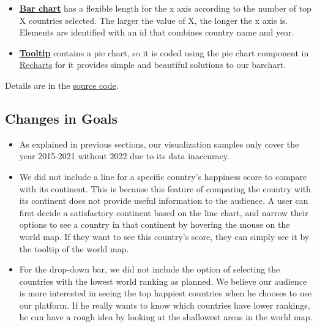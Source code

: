 \documentclass{article}
\begin{document}
\begin{itemize}
    \item \textbf{\href{https://github.com/SilvesterYu/DATS-SHU235-Information-Visualization-Final-Project/blob/main/src/barChart.js}{Bar chart}} has a flexible length for the x axis according to the number of top X countries selected. The larger the value of X, the longer the x axis is. Elements are identified with an id that combines country name and year. 
    
    \item \textbf{\href{https://github.com/SilvesterYu/DATS-SHU235-Information-Visualization-Final-Project/blob/main/src/toolTip.js}{Tooltip}} contains a pie chart, so it is coded using the pie chart component in \href{https://recharts.org/en-US/api/PieChart}{Recharts} for it provides simple and beautiful solutions to our barchart. 
\end{itemize}

Details are in the \href{https://github.com/SilvesterYu/DATS-SHU235-Information-Visualization-Final-Project}{source code}. 


\subsection{Changes in Goals}
\begin{itemize}
    \item As explained in previous sections, our visualization samples only cover the year 2015-2021 without 2022 due to its data inaccuracy.
    \item We did not include a line for a specific country's happiness score to compare with its continent. This is because this feature of comparing the country with its continent does not provide useful information to the audience. A user can first decide a satisfactory continent based on the line chart, and narrow their options to see a country in that continent by hovering the mouse on the world map. If they want to see this country's score, they can simply see it by the tooltip of the world map.
    
    \item For the drop-down bar, we did not include the option of selecting the countries with the lowest world ranking as planned. We believe our audience is more interested in seeing the top happiest countries when he chooses to use our platform. If he really wants to know which countries have lower rankings, he can have a rough idea by looking at the shallowest areas in the world map. 
\end{itemize}
\end{document}
